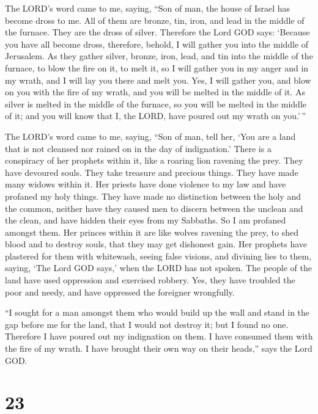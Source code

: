  The LORD's word came to me, saying, 
``Son of man, the house of Israel has become dross to me. All of them
are bronze, tin, iron, and lead in the middle of the furnace. They are
the dross of silver.  Therefore the Lord GOD says:
`Because you have all become dross, therefore, behold, I will gather you
into the middle of Jerusalem.  As they gather silver,
bronze, iron, lead, and tin into the middle of the furnace, to blow the
fire on it, to melt it, so I will gather you in my anger and in my
wrath, and I will lay you there and melt you.  Yes, I
will gather you, and blow on you with the fire of my wrath, and you will
be melted in the middle of it.  As silver is melted in
the middle of the furnace, so you will be melted in the middle of it;
and you will know that I, the LORD, have poured out my wrath on
you.'\,''

 The LORD's word came to me, saying, 
``Son of man, tell her, `You are a land that is not cleansed nor rained
on in the day of indignation.'  There is a conspiracy of
her prophets within it, like a roaring lion ravening the prey. They have
devoured souls. They take treasure and precious things. They have made
many widows within it.  Her priests have done violence to
my law and have profaned my holy things. They have made no distinction
between the holy and the common, neither have they caused men to discern
between the unclean and the clean, and have hidden their eyes from my
Sabbaths. So I am profaned amongst them.  Her princes
within it are like wolves ravening the prey, to shed blood and to
destroy souls, that they may get dishonest gain.  Her
prophets have plastered for them with whitewash, seeing false visions,
and divining lies to them, saying, `The Lord GOD says,' when the LORD
has not spoken.  The people of the land have used
oppression and exercised robbery. Yes, they have troubled the poor and
needy, and have oppressed the foreigner wrongfully.

 ``I sought for a man amongst them who would build up the
wall and stand in the gap before me for the land, that I would not
destroy it; but I found no one.  Therefore I have poured
out my indignation on them. I have consumed them with the fire of my
wrath. I have brought their own way on their heads,'' says the Lord GOD.

\hypertarget{section-21}{%
\section{23}\label{section-21}}

